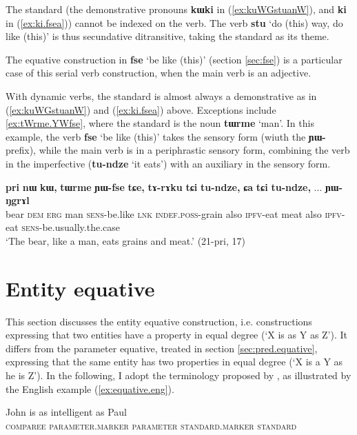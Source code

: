 \documentclass[oneside,a4paper,11pt]{article}
\newcommand{\ipa}[1]{{\phon\textbf{#1}}}
\newcommand{\forme}[2]{\ipa{#1} `#2'}
\begin{document}
The standard (the demonstrative pronouns \ipa{kɯki} in (\ref{ex:kuWGstuanW}), and \ipa{ki} in (\ref{ex:ki.fsea})) cannot be indexed on the verb. The verb \forme{stu}{do (this) way, do like (this)} is thus secundative ditransitive, taking the standard as its theme. 

The equative construction in \ipa{fse} `be like (this)' (section \ref{sec:fse}) is a particular case of this serial verb construction, when the main verb is an adjective.

With dynamic verbs, the standard is almost always a demonstrative as in (\ref{ex:kuWGstuanW}) and (\ref{ex:ki.fsea}) above. Exceptions include \ref{ex:tWrme.YWfse}, where the standard is the noun \forme{tɯrme}{man}. In this example, the verb \forme{fse}{be like (this)} takes the sensory form (wiuth the \ipa{ɲɯ-} prefix), while the main verb is in a periphrastic sensory form, combining  the verb in the imperfective (\ipa{tu-ndze} `it eats') with an auxiliary in the sensory form.

\begin{exe}
\ex \label{ex:tWrme.YWfse}
\gll
\ipa{pri} 	\ipa{nɯ} 	\ipa{kɯ,} \ipa{tɯrme} 	\ipa{ɲɯ-fse} 	\ipa{tɕe,} 	\ipa{tɤ-rɤku} 	\ipa{tɕi} 	\ipa{tu-ndze,} 	\ipa{ɕa} 	\ipa{tɕi} 	\ipa{tu-ndze,} ... \ipa{ɲɯ-ŋgrɤl} \\
bear \textsc{dem} \textsc{erg} man \textsc{sens}-be.like \textsc{lnk} \textsc{indef.poss}-grain also \textsc{ipfv}-eat meat also \textsc{ipfv}-eat { } \textsc{sens}-be.usually.the.case \\
\glt `The bear, like a man, eats grains and meat.' (21-pri, 17)
\end{exe}

\section{Entity equative} \label{sec:arg.equative}
This section discusses the entity equative construction, i.e. constructions expressing that two entities have a property in equal degree (`X is as Y as Z'). It differs from the parameter equative, treated in section \ref{sec:pred.equative}, expressing that the same entity has two properties in equal degree (`X is a Y as he is Z'). In the following, I adopt the terminology proposed by \citet{haspelmath08equative}, as illustrated by the English example (\ref{ex:equative.eng}). 

\begin{exe}
\ex \label{ex:equative.eng}
\gll  John is as intelligent as Paul \\
\textsc{comparee} { } \textsc{parameter.marker} \textsc{parameter} \textsc{standard.marker} \textsc{standard}  \\
\end{exe}
\end{document}
